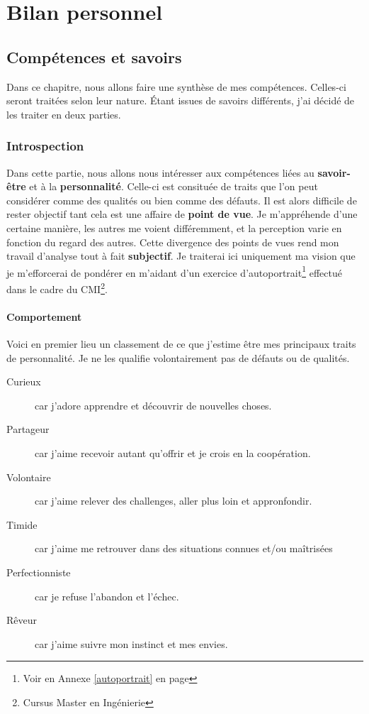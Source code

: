 \documentclass[a4paper,12pt, draft]{report}
\begin{document}
\paragraph{}

\part{Bilan personnel}

\chapter{Compétences et savoirs} 

Dans ce chapitre, nous allons faire une synthèse de mes compétences.
Celles-ci seront traitées selon leur nature.
Étant issues de savoirs différents, j'ai décidé de les traiter en deux parties.


\section{Introspection}
Dans cette partie, nous allons nous intéresser aux compétences liées au \textbf{savoir-être} et à la \textbf{personnalité}. Celle-ci est consituée de traits que l'on peut considérer comme des qualités ou bien comme des défauts. Il est alors difficile de rester objectif tant cela est une affaire de \textbf{point de vue}. Je m'appréhende d'une certaine manière, les autres me voient différemment, et la perception varie en fonction du regard des autres. Cette divergence des points de vues rend mon travail d'analyse tout à fait \textbf{subjectif}. Je traiterai ici uniquement ma vision que je m'efforcerai de pondérer en m'aidant d'un exercice d'autoportrait\footnote{Voir en Annexe \ref{autoportrait} en page \pageref{autoportrait}} effectué dans le cadre du CMI\footnote{Cursus Master en Ingénierie}.

\newpage
\subsection{Comportement}

Voici en premier lieu un classement de ce que j'estime être mes principaux traits de personnalité. Je ne les qualifie volontairement pas de défauts ou de qualités.\\

\begin{description}
\item [Curieux]car j'adore apprendre et découvrir de nouvelles choses.
\item [Partageur]car j'aime recevoir autant qu'offrir et je crois en la coopération.
\item [Volontaire]car j'aime relever des challenges, aller plus loin et appronfondir.
\item [Timide]car j'aime me retrouver dans des situations connues et/ou maîtrisées
\item [Perfectionniste]car je refuse l'abandon et l'échec.
\item [Rêveur]car j'aime suivre mon instinct et mes envies.
\end{description}
\end{document}
